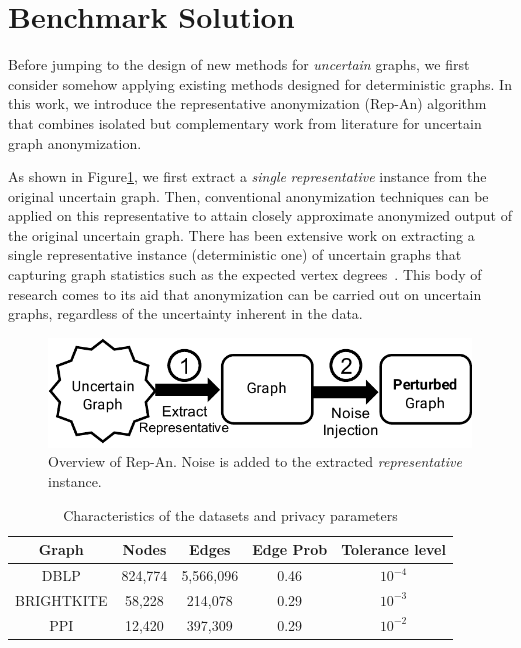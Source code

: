 \section{Benchmark Solution}
\label{sec:repOB}
Before jumping to the design of new methods for \emph{uncertain} graphs, we first consider somehow applying existing methods designed for deterministic graphs. 
In this work, we introduce the representative anonymization (Rep-An) algorithm that combines isolated but complementary work from literature for uncertain graph anonymization. 

As shown in Figure\ref{fig:repOB}, we first extract a \emph{single} \emph{representative} instance from the original uncertain graph. Then, conventional anonymization techniques can be applied on this representative to attain closely approximate anonymized output of the original uncertain graph. There has been extensive work on extracting a single representative instance (deterministic one) of uncertain graphs that capturing graph statistics such as the expected vertex degrees~\cite{Parchas_Gullo_Papadias_Bonchi_2014}. This body of research comes to its aid that anonymization can be carried out on uncertain graphs, regardless of the uncertainty inherent in the data. 

\begin{figure}[t]
  \vspace{-1em}
    \captionsetup{margin=0cm}
    \centering  
        \includegraphics[width=0.95\columnwidth]{AddFigure/repOB.pdf}
        \vspace{-0.7em}
      \caption{Overview of Rep-An. Noise is added to the extracted \emph{representative} instance.}
    \label{fig:repOB}
    \vspace{-0.5em}
\end{figure}

\begin{table}[t]
    \centering
        \caption{Characteristics of the datasets and privacy parameters}
        \begin{tabular}{|c|c|c|c||c|}
        \hline 
        Graph    & Nodes    & Edges    &Edge Prob    & Tolerance level\\
        \hline  
        DBLP     &824,774   &5,566,096 & 0.46        & $10^{-4}$\\
        \small{BRIGHTKITE} &58,228   & 214,078 &0.29 &$10^{-3}$ \\
        PPI      &12,420   & 397,309  & 0.29         &$10^{-2}$\\
        \hline
        \end{tabular}
        \label{tab:dataset}
\end{table}

